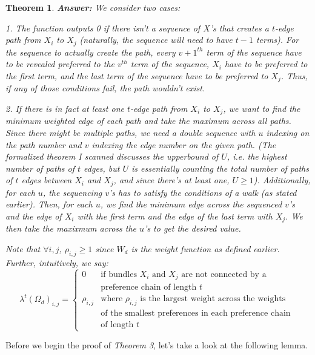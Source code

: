 \documentclass{article} %
\newtheorem{theorem}{Theorem}
\begin{document}
\begin{theorem}
{\textbf{Answer:} We consider two cases:

1. The function outputs 0 if there isn't a sequence of $X$'s that creates a $t$-edge path from $X_i$ to $X_j$ (naturally, the sequence will need to have $t-1$ terms). For the sequence to actually create the path, every $v+1^{th}$ term of the sequence have to be revealed preferred to the $v^{th}$ term of the sequence, $X_i$ have to be preferred to the first term, and the last term of the sequence have to be preferred to $X_j$. Thus, if any of those conditions fail, the path wouldn't exist. 

2. If there is in fact at least one $t$-edge path from $X_i$ to $X_j$, we want to find the minimum weighted edge of each path and take the maximum across all paths. Since there might be multiple paths, we need a double sequence with $u$ indexing on the path number and $v$ indexing the edge number on the given path. (The formalized theorem I scanned discusses the upperbound of $U$, i.e. the highest number of paths of $t$ edges, but $U$ is essentially counting the total number of paths of $t$ edges between $X_i$ and $X_j$, and since there's at least one, $U\geq1$). Additionally, for each $u$, the sequencing $v$'s has to satisfy the conditions of a walk (as stated earlier). Then, for each $u$, we find the minimum edge across the sequenced $v$'s and the edge of $X_i$ with the first term and the edge of the last term with $X_j$. We then take the maxixmum across the $u$'s to get the desired value.}
Note that $\forall i,j$, $\rho_{i,j}\geq1$ since $W_d$ is the weight function as defined earlier. Further, intuitively, we say:
\[
  \lambda^t(\Omega_d)_{i,j}=
  \begin{cases}
  0 & \textrm{if bundles }X_i \textrm{ and }X_j\textrm{ are not connected by a} \\
  & \textrm{preference chain of length } t\\
  \rho_{i,j} & \textrm{where }\rho_{i,j}\textrm{ is the largest weight across the weights} \\
  & \textrm{of the smallest preferences in each preference chain }\\
  & \textrm{of length }t
  \end{cases}
\]
\end{theorem}

Before we begin the proof of \textit{Theorem 3}, let's take a look at the following lemma.
\end{document}
